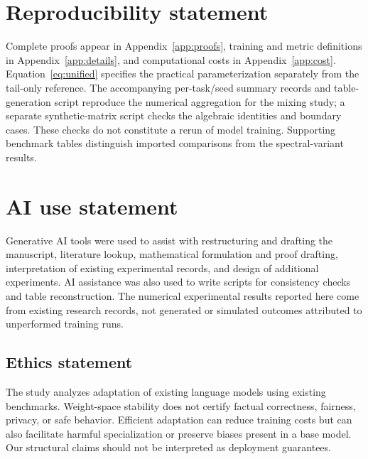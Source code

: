 \section*{Reproducibility statement}
Complete proofs appear in Appendix~\ref{app:proofs}, training and metric definitions in Appendix~\ref{app:details}, and computational costs in Appendix~\ref{app:cost}. Equation~\eqref{eq:unified} specifies the practical parameterization separately from the tail-only reference. The accompanying per-task/seed summary records and table-generation script reproduce the numerical aggregation for the mixing study; a separate synthetic-matrix script checks the algebraic identities and boundary cases. These checks do not constitute a rerun of model training. Supporting benchmark tables distinguish imported comparisons from the spectral-variant results.

\section*{AI use statement}
Generative AI tools were used to assist with restructuring and drafting the manuscript, literature lookup, mathematical formulation and proof drafting, interpretation of existing experimental records, and design of additional experiments. AI assistance was also used to write scripts for consistency checks and table reconstruction. The numerical experimental results reported here come from existing research records, not generated or simulated outcomes attributed to unperformed training runs.

\begin{samepage}
\section*{Ethics statement}
The study analyzes adaptation of existing language models using existing benchmarks. Weight-space stability does not certify factual correctness, fairness, privacy, or safe behavior. Efficient adaptation can reduce training costs but can also facilitate harmful specialization or preserve biases present in a base model. Our structural claims should not be interpreted as deployment guarantees.\par
\end{samepage}
